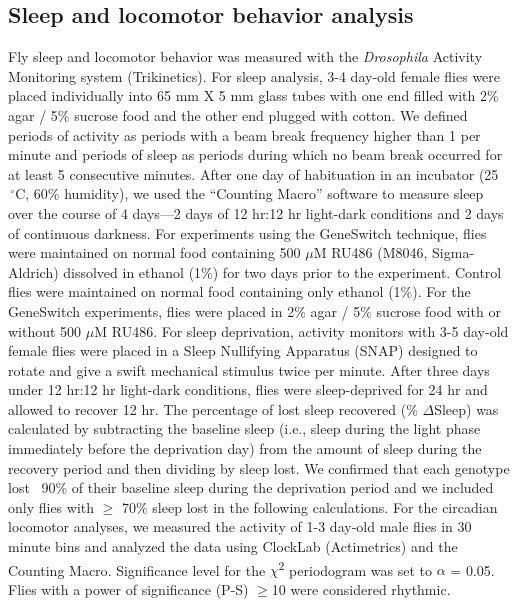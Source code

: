 \subsection*{Sleep and locomotor behavior analysis}

Fly sleep and locomotor behavior was measured with the \emph{Drosophila} Activity Monitoring system (Trikinetics).
For sleep analysis, 3-4 day-old female flies were placed individually into 65 mm X 5 mm glass tubes with one end filled with 2\% agar / 5\% sucrose food and the other end plugged with cotton.
We defined periods of activity as periods with a beam break frequency higher than 1 per minute and periods of sleep as periods during which no beam break occurred for at least 5 consecutive minutes\cite{Shaw:2000ui}.
After one day of habituation in an incubator (25$\,^{\circ}\mathrm{C}$, 60\% humidity), we used the ``Counting Macro'' software\cite{pfeiffenberger:2010ab} to measure sleep over the course of 4 days---2 days of 12 hr:12 hr light-dark conditions and 2 days of continuous darkness.
For experiments using the GeneSwitch technique, flies were maintained on normal food containing 500 $\mu$M RU486 (M8046, Sigma-Aldrich) dissolved in ethanol (1\%) for two days prior to the experiment.
Control flies were maintained on normal food containing only ethanol (1\%).
For the GeneSwitch experiments, flies were placed in 2\% agar / 5\% sucrose food with or without 500 $\mu$M RU486.
For sleep deprivation, activity monitors with 3-5 day-old female flies were placed in a Sleep Nullifying Apparatus (SNAP)\cite{shaw:2002aa} designed to rotate and give a swift mechanical stimulus twice per minute.
After three days under 12 hr:12 hr light-dark conditions, flies were sleep-deprived for 24 hr and allowed to recover 12 hr.
The percentage of lost sleep recovered (\% $\Delta$Sleep) was calculated by subtracting the baseline sleep (i.e., sleep during the light phase immediately before the deprivation day) from the amount of sleep during the recovery period and then dividing by sleep lost.
We confirmed that each genotype lost ~90\% of their baseline sleep during the deprivation period and we included only flies with $\geq$ 70\% sleep lost in the following calculations.
For the circadian locomotor analyses, we measured the activity of 1-3 day-old male flies in 30 minute bins and analyzed the data using ClockLab (Actimetrics) and the Counting Macro\cite{pfeiffenberger:2010aa}.
Significance level for the $\chi$\textsuperscript{2} periodogram was set to $\alpha$ = 0.05.
Flies with a power of significance (P-S) $\geq$10 were considered rhythmic.

  